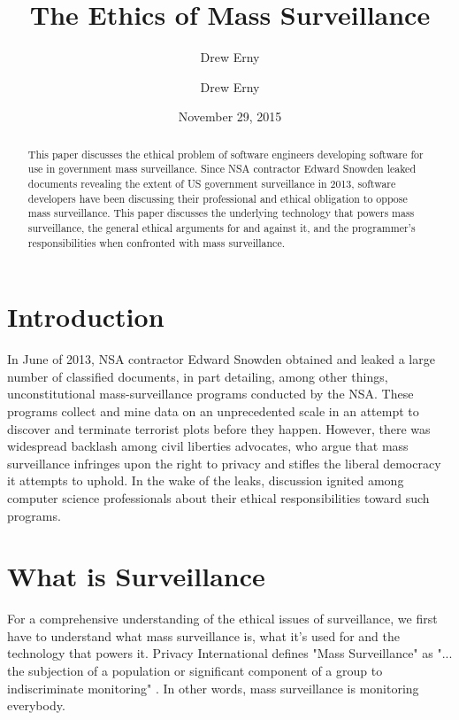 \documentclass{sig-alternate-05-2015}
\begin{document}
\title{The Ethics of Mass Surveillance}
\author{Drew Erny}
\date{November 29, 2015}


\author{
  \alignauthor
  Drew Erny
}

\maketitle
\begin{abstract}
This paper discusses the ethical problem of software engineers developing
software for use in government mass surveillance. Since NSA contractor Edward
Snowden leaked documents revealing the extent of US government surveillance in
2013, software developers have been discussing their professional and ethical
obligation to oppose mass surveillance. This paper discusses the underlying
technology that powers mass surveillance, the general ethical arguments for and
against it, and the programmer's responsibilities when confronted with mass
surveillance.
\end{abstract}

\section{Introduction}
In June of 2013, NSA contractor Edward Snowden obtained and leaked a large
number of classified documents, in part detailing, among other things,
unconstitutional mass-surveillance programs conducted by the NSA. These
programs collect and mine data on an unprecedented scale in an attempt to
discover and terminate terrorist plots before they happen. However, there was
widespread backlash among civil liberties advocates, who argue that mass
surveillance infringes upon the right to privacy and stifles the liberal
democracy it attempts to uphold. In the wake of the leaks, discussion ignited
among computer science professionals about their ethical responsibilities
toward such programs. 

\section{What is Surveillance}

For a comprehensive understanding of the ethical issues of surveillance, we
first have to understand what mass surveillance is, what it's used for and the
technology that powers it. Privacy International defines "Mass Surveillance" as
"... the subjection of a population or significant component of a group to
indiscriminate monitoring" \cite{website:privint}. In other words, mass
surveillance is monitoring everybody. 
\end{document}
